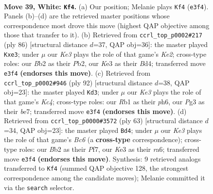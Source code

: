 \documentclass[11pt]{article}
\begin{document}
\clearpage

\begin{figure}[p]\centering
\begin{subfigure}{0.46\textwidth}\centering
\resizebox{\linewidth}{!}{%
\newchessgame
\chessboard[
  setfen={4r3/3n1k2/8/8/p1p1p3/P1P1K1Pp/1BP2P1P/1R6 w - - 11 39},
  showmover=false,
  pgfstyle=straightmove, color=movearrow, markmove={e3-f4}
]}
\caption{}
\end{subfigure}\hfill
\begin{subfigure}{0.46\textwidth}\centering
\resizebox{\linewidth}{!}{%
\newchessgame
\chessboard[
  setfen={2r1k3/5p2/8/3pPP1p/3B3P/1P2p1P1/1P2K3/8 w - - 3 44},
  showmover=false,
  pgfstyle=straightmove, color=movearrow, markmove={e2-e3}
]}
\caption{}
\end{subfigure}
\\[4pt]
\begin{subfigure}{0.46\textwidth}\centering
\resizebox{\linewidth}{!}{%
\newchessgame
\chessboard[
  setfen={B7/4b3/3k3p/p4p2/PpK2p2/1P5P/5PP1/8 w - - 16 47},
  showmover=false,
  pgfstyle=straightmove, color=movearrow, markmove={c4-d3}
]}
\caption{}
\end{subfigure}\hfill
\begin{subfigure}{0.46\textwidth}\centering
\resizebox{\linewidth}{!}{%
\newchessgame
\chessboard[
  setfen={8/1r3pk1/Rp2p3/6p1/1PP1P2p/2bN1P1P/8/5K2 b - - 0 32},
  showmover=false,
  pgfstyle=straightmove, color=movearrow, markmove={c3-d4}
]}
\caption{}
\end{subfigure}
\caption{\textbf{Move 39, White: \texttt{Kf4}.} (a) Our position; Melanie plays \texttt{Kf4} (\texttt{e3f4}). Panels (b)--(d) are the retrieved master positions whose correspondence most drove this move (highest QAP objective among those that transfer to it). (b) Retrieved from \texttt{ccrl\_top\_p0002\#217} (ply 86) [structural distance $d$=37, QAP obj=36]: the master played \texttt{Kxe3}; under $\mu$ our \emph{Ke3} plays the role of that game's \emph{Ke2}; cross-type roles: our \emph{B}b2 as their \emph{P}b2, our \emph{K}e3 as their \emph{B}d4; transferred move \texttt{e3f4} \textbf{(endorses this move)}. (c) Retrieved from \texttt{ccrl\_top\_p0002\#946} (ply 92) [structural distance $d$=38, QAP obj=23]: the master played \texttt{Kd3}; under $\mu$ our \emph{Ke3} plays the role of that game's \emph{Kc4}; cross-type roles: our \emph{R}b1 as their \emph{p}h6, our \emph{P}g3 as their \emph{b}e7; transferred move \texttt{e3f4} \textbf{(endorses this move)}. (d) Retrieved from \texttt{ccrl\_top\_p0000\#3572} (ply 63) [structural distance $d$=34, QAP obj=23]: the master played \texttt{Bd4}; under $\mu$ our \emph{Ke3} plays the role of that game's \emph{Bc6} (a \textbf{cross-type} correspondence); cross-type roles: our \emph{B}b2 as their \emph{P}f7, our \emph{K}e3 as their \emph{r}a6; transferred move \texttt{e3f4} \textbf{(endorses this move)}. Synthesis: 9 retrieved analogs transferred to \texttt{Kf4} (summed QAP objective 128, the strongest correspondence among the candidate moves); Melanie committed it via the \texttt{search} selector.}
\label{fig:thought-m76}
\end{figure}
\end{document}
